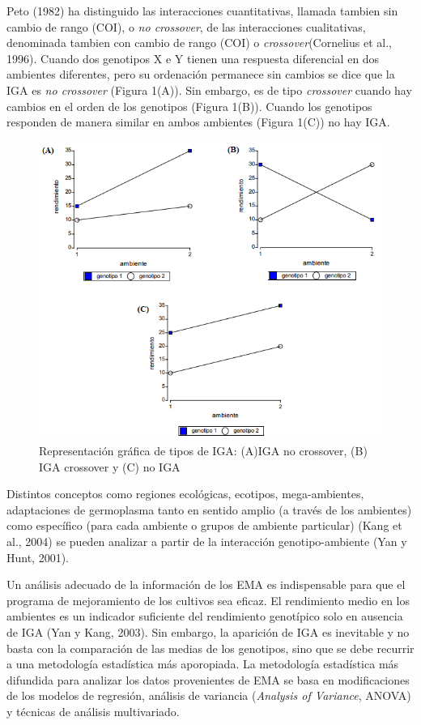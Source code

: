 Peto (1982) ha distinguido las interacciones cuantitativas, llamada tambien sin cambio de rango (COI), o \emph{no crossover}, de las interacciones cualitativas, denominada tambien con
cambio de rango (COI) o \emph{crossover}(Cornelius et al., 1996). Cuando dos genotipos X e Y tienen una respuesta diferencial en dos ambientes diferentes, pero su ordenación permanece sin cambios se dice que la IGA es \emph{no crossover} (Figura 1(A)). Sin embargo, es de tipo \emph{crossover} cuando hay cambios en el orden de los genotipos (Figura  1(B)). Cuando los genotipos responden de manera similar en ambos ambientes (Figura 1(C)) no hay IGA. 


\begin{figure}[h]
\begin{center}
\includegraphics[width=14cm]{./Graficos/figura1}
\end{center}
\caption{Representación gráfica de tipos de IGA: (A)IGA no crossover, (B) IGA crossover y (C) no IGA}
\end{figure}


Distintos conceptos como regiones ecológicas, ecotipos, mega-ambientes, adaptaciones de germoplasma tanto en sentido amplio (a través de los ambientes) como específico (para cada ambiente o grupos de ambiente particular) (Kang et al., 2004) se pueden analizar a partir de la interacción genotipo-ambiente (Yan y Hunt, 2001).


Un análisis adecuado de la información de los EMA es indispensable para que el programa de mejoramiento de los cultivos sea eficaz. El rendimiento medio en los ambientes es un indicador suficiente del rendimiento genotípico solo en ausencia de IGA (Yan y Kang, 2003). Sin embargo, la aparición de IGA es inevitable y no basta con la comparación de las medias de los genotipos, sino que se debe recurrir a una metodología estadística más aporopiada. La metodología estadística más difundida para analizar los datos provenientes de EMA se basa en modificaciones de los modelos de regresión, análisis de variancia (\emph{Analysis of Variance}, ANOVA) y técnicas de análisis multivariado. 


